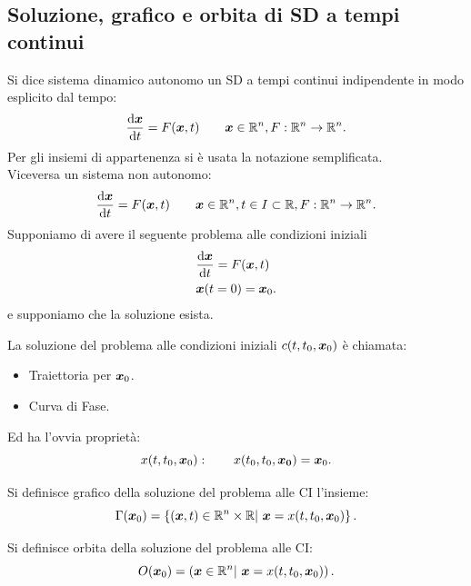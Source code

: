 \subsection{Soluzione, grafico e orbita di SD a tempi continui}%
\label{sub:Soluzione, grafico e orbita di SD a tempi continui}
Si dice sistema dinamico autonomo un SD a tempi continui indipendente in modo esplicito dal tempo:
\[
    \frac{\text{d} \boldsymbol{x}}{\text{d} t} = F(\boldsymbol{x}, t) \qquad \boldsymbol{x}\in \mathbb{R}^n, F:\mathbb{R}^n\to \mathbb{R}^n
.\] 
Per gli insiemi di appartenenza si è usata la notazione semplificata.\\
Viceversa un sistema non autonomo:
\[
    \frac{\text{d} \boldsymbol{x}}{\text{d} t} =F(\boldsymbol{x}, t) \qquad 
    \boldsymbol{x}\in \mathbb{R}^n, t \in I \subset \mathbb{R}, F:\mathbb{R}^n\to \mathbb{R}^n
.\] 
Supponiamo di avere il seguente problema alle condizioni iniziali
\[\begin{aligned}
    & \frac{\text{d} \boldsymbol{x}}{\text{d} t} = F(\boldsymbol{x} ,t)\\
    & \boldsymbol{x} (t=0) = \boldsymbol{x}_0
.\end{aligned}\]
e supponiamo che la soluzione esista.
\begin{defn}
    La soluzione del problema alle condizioni iniziali $c (t, t_0, \boldsymbol{x}_0)$ è chiamata:
    \begin{itemize}
        \item Traiettoria per $\boldsymbol{x}_0$.
	\item Curva di Fase.
    \end{itemize}
    Ed ha l'ovvia proprietà:
    \[
	x(t, t_0, \boldsymbol{x}_0): \qquad x (t_0, t_0, \boldsymbol{x_0}) = \boldsymbol{x}_0
    .\] 
\end{defn}
\noindent
\begin{defn}[Grafico]
    Si definisce grafico della soluzione del problema alle CI l'insieme:
    \[
	\Gamma (\boldsymbol{x}_0) = \left\{(\boldsymbol{x}, t) \in \mathbb{R}^n \times \mathbb{R} | \ \boldsymbol{x}  = x(t, t_0, \boldsymbol{x}_0)\right\}
    .\] 
\end{defn}
\noindent
\begin{defn}[Orbita]
    Si definisce orbita della soluzione del problema alle CI:
    \[
	O(\boldsymbol{x}_0) = \left(\boldsymbol{x}\in \mathbb{R}^n | \ \boldsymbol{x}  = x(t, t_0, \boldsymbol{x}_0)\right)
    .\] 
\end{defn}
\noindent
